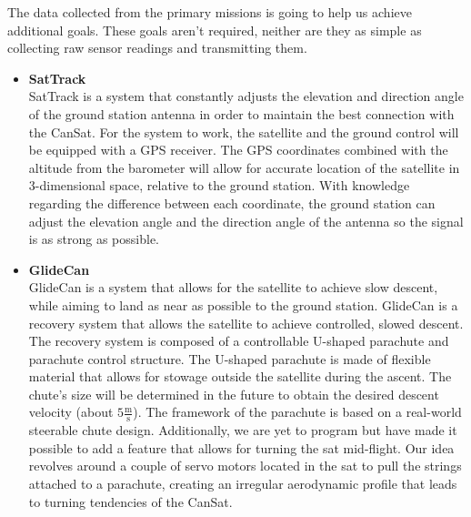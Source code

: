 \documentclass[class=report, crop=false]{standalone}
\begin{document}
The data collected from the primary missions is going to help us achieve additional goals. These goals aren't required, neither are they as simple as collecting raw sensor readings and transmitting them.
	\begin{itemize}
	\item \textbf{SatTrack} \\
  SatTrack is a system that constantly adjusts the elevation and direction angle of the ground station antenna in order to maintain the best connection with the CanSat. For the system to work, the satellite and the ground control will be equipped with a GPS receiver. The GPS coordinates combined with the altitude from the barometer will allow for accurate location of the satellite in 3-dimensional space, relative to the ground station. With knowledge regarding the difference between each coordinate, the ground station can adjust the elevation angle and the direction angle of the antenna so the signal is as strong as possible.
\item \textbf{GlideCan} \\
  GlideCan is a system that allows for the satellite to achieve slow descent, while aiming to land as near as possible to the ground station. 
	GlideCan is a recovery system that allows the satellite to achieve controlled, slowed descent. The recovery system is composed of a controllable U-shaped parachute and parachute control structure. The U-shaped parachute is made of flexible material that allows for stowage outside the satellite during the ascent. The chute's size will be determined in the future to obtain the desired descent velocity (about $5\frac{\text{m}}{\text{s}}$). The framework of the parachute is based on a real-world steerable chute design. Additionally, we are yet to program but have made it possible to add a feature that allows for turning the sat mid-flight. Our idea revolves around a couple of servo motors located in the sat to pull the strings attached to a parachute, creating an irregular aerodynamic profile that leads to turning tendencies of the CanSat.
	\end{itemize}
\end{document}
